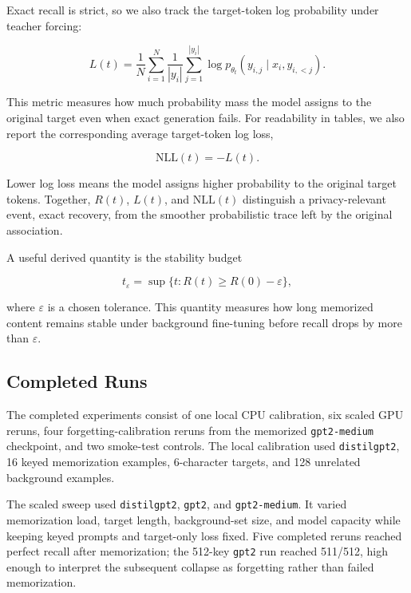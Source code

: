 \documentclass{article}
\begin{document}
Exact recall is strict, so we also track the target-token log probability under teacher forcing:

\begin{equation}
L(t)
=
\frac{1}{N}
\sum_{i=1}^{N}
\frac{1}{|y_i|}
\sum_{j=1}^{|y_i|}
\log p_{\theta_t}(y_{i,j} \mid x_i, y_{i,<j}).
\end{equation}

This metric measures how much probability mass the model assigns to the original target even when exact generation fails. For readability in tables, we also report the corresponding average target-token log loss,

\begin{equation}
\mathrm{NLL}(t) = -L(t).
\end{equation}

Lower log loss means the model assigns higher probability to the original target tokens. Together, $R(t)$, $L(t)$, and $\mathrm{NLL}(t)$ distinguish a privacy-relevant event, exact recovery, from the smoother probabilistic trace left by the original association.

A useful derived quantity is the stability budget

\begin{equation}
t_{\varepsilon}
=
\sup \{t : R(t) \geq R(0) - \varepsilon\},
\end{equation}

where $\varepsilon$ is a chosen tolerance. This quantity measures how long memorized content remains stable under background fine-tuning before recall drops by more than $\varepsilon$.

\subsection{Completed Runs}

The completed experiments consist of one local CPU calibration, six scaled GPU reruns, four forgetting-calibration reruns from the memorized \texttt{gpt2-medium} checkpoint, and two smoke-test controls. The local calibration used \texttt{distilgpt2}, 16 keyed memorization examples, 6-character targets, and 128 unrelated background examples.

The scaled sweep used \texttt{distilgpt2}, \texttt{gpt2}, and \texttt{gpt2-medium}. It varied memorization load, target length, background-set size, and model capacity while keeping keyed prompts and target-only loss fixed. Five completed reruns reached perfect recall after memorization; the 512-key \texttt{gpt2} run reached 511/512, high enough to interpret the subsequent collapse as forgetting rather than failed memorization.
\end{document}
